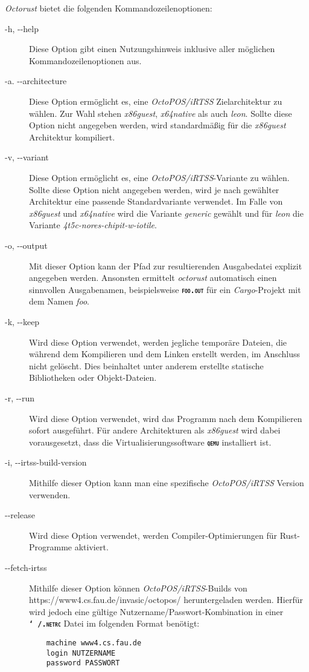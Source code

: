 \textit{Octorust} bietet die folgenden Kommandozeilenoptionen:
\begin{description}

	\item[-h, -{}-help]
	Diese Option gibt einen Nutzungshinweis inklusive aller möglichen Kommandozeilenoptionen aus.
	
	\item[-a. -{}-architecture]
	Diese Option ermöglicht es, eine \textit{OctoPOS/iRTSS} Zielarchitektur zu wählen. Zur Wahl stehen \textit{x86guest},
	\textit{x64native} als auch \textit{leon}.
	Sollte diese Option nicht angegeben werden, wird standardmäßig für die \textit{x86guest} Architektur kompiliert.
	
	\item[-v, -{}-variant]
	Diese Option ermöglicht es, eine \textit{OctoPOS/iRTSS}-Variante zu wählen.
	Sollte diese Option nicht angegeben werden, wird je nach gewählter Architektur
	eine passende Standardvariante verwendet.
	Im Falle von \textit{x86guest} und \textit{x64native} wird die Variante \textit{generic} gewählt und für 
	\textit{leon} die Variante \textit{4t5c-nores-chipit-w-iotile}.
	
	\item[-o, -{}-output]
	Mit dieser Option kann der Pfad zur resultierenden Ausgabedatei explizit angegeben	werden.
	Ansonsten ermittelt \textit{octorust} automatisch einen sinnvollen Ausgabenamen,
	beispielsweise \texttt{\textsc{\textbf{foo.out}}} für ein \textit{Cargo}-Projekt mit dem Namen
	\textit{foo}.
	
	\item[-k, -{}-keep]
	Wird diese Option verwendet, werden jegliche temporäre Dateien,
	die während dem Kompilieren und dem Linken erstellt werden, im
	Anschluss nicht gelöscht.
	Dies beinhaltet unter anderem erstellte statische Bibliotheken oder Objekt-Dateien.
	
	\item[-r, -{}-run]
	Wird diese Option verwendet, wird das Programm nach dem Kompilieren sofort ausgeführt.
	Für andere Architekturen als \textit{x86guest} wird dabei vorausgesetzt,
	dass die Virtualisierungssoftware \texttt{\textsc{\textbf{qemu}}} installiert ist.
	
	\item[-i, -{}-irtss-build-version]
	Mithilfe dieser Option kann man eine spezifische \textit{OctoPOS/iRTSS} Version verwenden.
	
	\item[-{}-release]
	Wird diese Option verwendet, werden Compiler-Optimierungen für Rust-Programme aktiviert.
	
	\item[-{}-fetch-irtss]
	Mithilfe dieser Option können \textit{OctoPOS/iRTSS}-Builds von \\
	https://www4.cs.fau.de/invasic/octopos/ heruntergeladen werden. Hierfür wird jedoch
	eine gültige Nutzername/Passwort-Kombination in einer \texttt{\textsc{\textbf{\char`~/.netrc}}}
	Datei im folgenden Format benötigt:
	\begin{verbatim}
	machine www4.cs.fau.de
	login NUTZERNAME
	password PASSWORT
	\end{verbatim}
\end{description}

